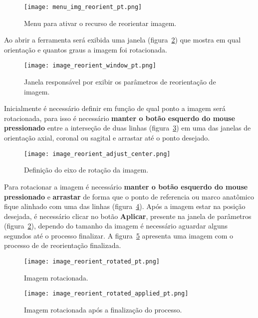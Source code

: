 \begin{figure}[!htb]
\centering
\texttt{[image: menu\_img\_reorient\_pt.png]}
\caption{Menu para ativar o recurso de reorientar imagem.}
\label{fig:menu_img_reorient}
\end{figure}

Ao abrir a ferramenta será exibida uma janela (figura~\ref{fig:image_reorient_window}) que mostra em qual orientação e quantos graus a imagem foi rotacionada.

\begin{figure}[!htb]
\centering
\texttt{[image: image\_reorient\_window\_pt.png]}
\caption{Janela responsável por exibir os parâmetros de reorientação de imagem.}
\label{fig:image_reorient_window}
\end{figure}

Inicialmente é necessário definir em função de qual ponto a imagem será rotacionada, para isso é necessário \textbf{manter o botão esquerdo do mouse pressionado} entre a interseção de duas linhas (figura~\ref{fig:image_reorient_adjust_center}) em uma das janelas de orientação axial, coronal ou sagital e arrastar até o ponto desejado.

\begin{figure}[!htb]
\centering
\texttt{[image: image\_reorient\_adjust\_center.png]}
\caption{Definição do eixo de rotação da imagem.}
\label{fig:image_reorient_adjust_center}
\end{figure}

Para rotacionar a imagem é necessário \textbf{manter o botão esquerdo do mouse pressionado} e \textbf{arrastar} de forma que o ponto de referencia ou marco anatômico fique alinhado com uma das linhas (figura~\ref{fig:image_reorient_rotated}). Após a imagem estar na posição desejada, é necessário clicar no botão \textbf{Aplicar}, presente na janela de parâmetros (figura~\ref{fig:image_reorient_window}), dependo do tamanho da imagem é necessário aguardar alguns segundos até o processo finalizar. A figura~\ref{fig:image_reorient_rotated_applied} apresenta uma imagem com o processo de de reorientação finalizada. 

\begin{figure}[!htb]
\centering
\texttt{[image: image\_reorient\_rotated\_pt.png]}
\caption{Imagem rotacionada.}
\label{fig:image_reorient_rotated}
\end{figure}

\begin{figure}[!htb]
\centering
\texttt{[image: image\_reorient\_rotated\_applied\_pt.png]}
\caption{Imagem rotacionada após a finalização do processo.}
\label{fig:image_reorient_rotated_applied}
\end{figure}






